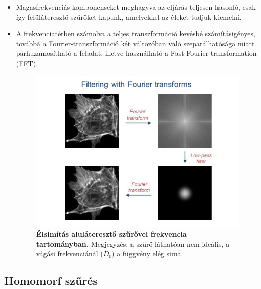 \documentclass[12pt]{article}
\theoremstyle{plain}
\begin{document}
\begin{itemize}
\item Magasfrekvenciás komponenseket meghagyva az eljárás teljesen hasonló, csak így felüláteresztő szűrőket kapunk, amelyekkel az éleket tudjuk kiemelni. 
\item A frekvenciatérben számolva a teljes transzformáció kevésbé számításigényes, továbbá a Fourier-transzformáció két változóban való szeparálhatósága miatt párhuzamosítható a feladat, illetve használható a Fast Fourier-transformation (FFT). 

\begin{figure}[H]
    \begin{center}
    \includegraphics[width=0.75\linewidth]{media/filter.jpg}
    \caption{\textbf{Élsimítás aluláteresztő szűrővel frekvencia tartományban.} Megjegyzés: a szűrő láthatóan nem ideális, a vágási frekvenciánál ($D_0$) a függvény elég sima.} 
    \label{fig:filter}
    \end{center}
\end{figure}

\end{itemize}{}

\subsection{Homomorf szűrés}
\end{document}
